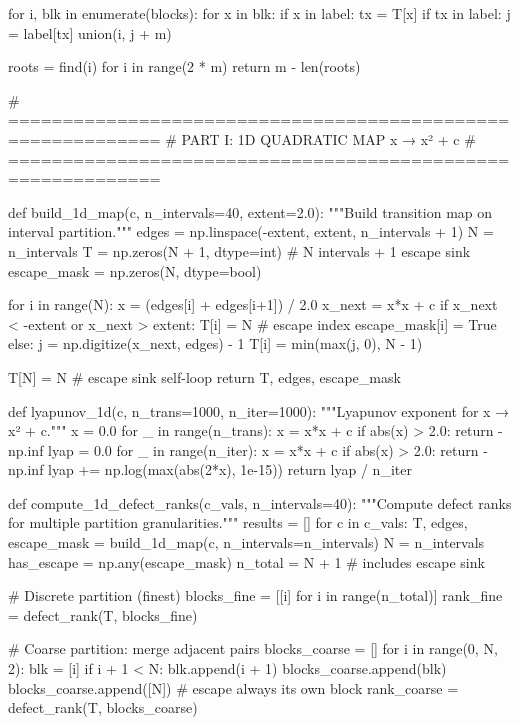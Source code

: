 {{{{{{{{{{{{{    for i, blk in enumerate(blocks):
        for x in blk:
            if x in label:
                tx = T[x]
                if tx in label:
                    j = label[tx]
                    union(i, j + m)
    
    roots = {find(i) for i in range(2 * m)}
    return m - len(roots)


# ============================================================
# PART I: 1D QUADRATIC MAP  x → x² + c
# ============================================================

def build_1d_map(c, n_intervals=40, extent=2.0):
    """Build transition map on interval partition."""
    edges = np.linspace(-extent, extent, n_intervals + 1)
    N = n_intervals
    T = np.zeros(N + 1, dtype=int)  # N intervals + 1 escape sink
    escape_mask = np.zeros(N, dtype=bool)
    
    for i in range(N):
        x = (edges[i] + edges[i+1]) / 2.0
        x_next = x*x + c
        if x_next < -extent or x_next > extent:
            T[i] = N  # escape index
            escape_mask[i] = True
        else:
            j = np.digitize(x_next, edges) - 1
            T[i] = min(max(j, 0), N - 1)
    
    T[N] = N  # escape sink self-loop
    return T, edges, escape_mask


def lyapunov_1d(c, n_trans=1000, n_iter=1000):
    """Lyapunov exponent for x → x² + c."""
    x = 0.0
    for _ in range(n_trans):
        x = x*x + c
        if abs(x) > 2.0:
            return -np.inf
    lyap = 0.0
    for _ in range(n_iter):
        x = x*x + c
        if abs(x) > 2.0:
            return -np.inf
        lyap += np.log(max(abs(2*x), 1e-15))
    return lyap / n_iter


def compute_1d_defect_ranks(c_vals, n_intervals=40):
    """Compute defect ranks for multiple partition granularities."""
    results = []
    for c in c_vals:
        T, edges, escape_mask = build_1d_map(c, n_intervals=n_intervals)
        N = n_intervals
        has_escape = np.any(escape_mask)
        n_total = N + 1  # includes escape sink
        
        # Discrete partition (finest)
        blocks_fine = [[i] for i in range(n_total)]
        rank_fine = defect_rank(T, blocks_fine)
        
        # Coarse partition: merge adjacent pairs
        blocks_coarse = []
        for i in range(0, N, 2):
            blk = [i]
            if i + 1 < N:
                blk.append(i + 1)
            blocks_coarse.append(blk)
        blocks_coarse.append([N])  # escape always its own block
        rank_coarse = defect_rank(T, blocks_coarse)
        
}}}}}}}}}}}}}
